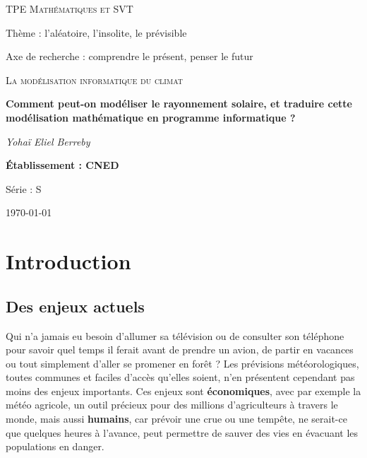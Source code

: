 \documentclass[12pt]{article}
\begin{document}

\begin{titlepage}
	\centering
	
	{\scshape\Large TPE Mathématiques et SVT\par}
	\vspace{0.2cm}	
	Thème : l'aléatoire, l'insolite, le prévisible\par
	Axe de recherche : comprendre le présent, penser le futur\par
	\vspace{1.5cm}

	{\scshape\LARGE La modélisation informatique du climat \par}
	\vspace{1cm}
	{\huge\bfseries Comment peut-on modéliser le rayonnement solaire, et traduire cette modélisation mathématique en programme informatique ?\par}

	\vspace{1cm}
	{\Large\itshape Yohaï Eliel Berreby\par}
	
	\vfill
	
	
	{\Large\bfseries Établissement : CNED\par
	Série : S }

	\vfill

	{\large \today\par}
\end{titlepage}


\clearpage
\tableofcontents{}
\clearpage


\section{Introduction} 

\subsection{Des enjeux actuels} %

Qui n'a jamais eu besoin d'allumer sa télévision ou de consulter son téléphone pour savoir quel temps il ferait avant de prendre un avion, de partir en vacances ou tout simplement d'aller se promener en forêt ?
Les prévisions météorologiques, toutes communes et faciles d'accès qu'elles soient, n'en présentent cependant pas moins des enjeux importants.
Ces enjeux sont \textbf{économiques}, avec par exemple la météo agricole, un outil précieux pour des millions d'agriculteurs à travers le monde, mais aussi \textbf{humains}, car prévoir une crue ou une tempête, ne serait-ce que quelques heures à l'avance, peut permettre de sauver des vies en évacuant les populations en danger.
\end{document}
